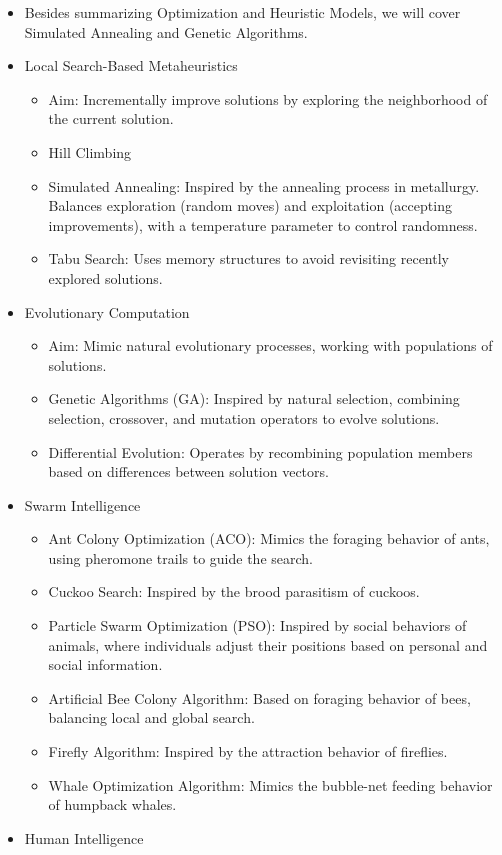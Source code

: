 \documentclass[
  letterpaper,
  DIV=11,
  numbers=noendperiod]{scrreprt}
\providecommand{\tightlist}{%
  \setlength{\itemsep}{0pt}\setlength{\parskip}{0pt}}\usepackage{longtable,booktabs,array}
\begin{document}
\begin{itemize}
\item
  Besides summarizing Optimization and Heuristic Models, we will cover
  Simulated Annealing and Genetic Algorithms.
\item
  Local Search-Based Metaheuristics

  \begin{itemize}
  \tightlist
  \item
    Aim: Incrementally improve solutions by exploring the neighborhood
    of the current solution.
  \item
    Hill Climbing
  \item
    Simulated Annealing: Inspired by the annealing process in
    metallurgy. Balances exploration (random moves) and exploitation
    (accepting improvements), with a temperature parameter to control
    randomness.
  \item
    Tabu Search: Uses memory structures to avoid revisiting recently
    explored solutions.
  \end{itemize}
\item
  Evolutionary Computation

  \begin{itemize}
  \tightlist
  \item
    Aim: Mimic natural evolutionary processes, working with populations
    of solutions.
  \item
    Genetic Algorithms (GA): Inspired by natural selection, combining
    selection, crossover, and mutation operators to evolve solutions.
  \item
    Differential Evolution: Operates by recombining population members
    based on differences between solution vectors.
  \end{itemize}
\item
  Swarm Intelligence

  \begin{itemize}
  \tightlist
  \item
    Ant Colony Optimization (ACO): Mimics the foraging behavior of ants,
    using pheromone trails to guide the search.
  \item
    Cuckoo Search: Inspired by the brood parasitism of cuckoos.
  \item
    Particle Swarm Optimization (PSO): Inspired by social behaviors of
    animals, where individuals adjust their positions based on personal
    and social information.
  \item
    Artificial Bee Colony Algorithm: Based on foraging behavior of bees,
    balancing local and global search.
  \item
    Firefly Algorithm: Inspired by the attraction behavior of fireflies.
  \item
    Whale Optimization Algorithm: Mimics the bubble-net feeding behavior
    of humpback whales.
  \end{itemize}
\item
  Human Intelligence


\end{itemize}
\end{document}
